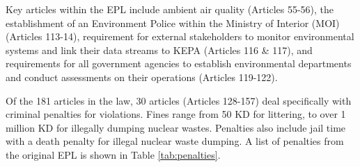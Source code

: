 \begin{table}[!htpb]
\centering
\caption{Summary of EPL structure.}
\label{tab:EPL}
\end{table}

Key articles within the EPL include ambient air quality (Articles 55-56), the establishment of an Environment Police within the Ministry of Interior (MOI) (Articles 113-14), requirement for external stakeholders to monitor environmental systems and link their data streams to KEPA (Articles 116 \& 117), and requirements for all government agencies to establish environmental departments and conduct assessments on their operations (Articles 119-122).

Of the 181 articles in the law, 30 articles (Articles 128-157) deal specifically with criminal penalties for violations. Fines range from 50 KD for littering, to over 1 million KD for illegally dumping nuclear wastes. Penalties also include jail time with a death penalty for illegal nuclear waste dumping. A list of penalties from the original EPL is shown in Table \ref{tab:penalties}.

